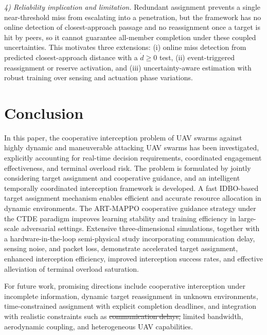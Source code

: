 \documentclass[lettersize,journal]{IEEEtran}
\newcommand{\hladd}[1]{{\color{blue}#1}}
\newcommand{\hldel}[1]{{\color{red}\sout{#1}}}
\begin{document}
\hladd{\emph{4) Reliability implication and limitation.} Redundant assignment prevents a single
near-threshold miss from escalating into a penetration, but the framework has no online detection of
closest-approach passage and no reassignment once a target is hit by peers, so it cannot guarantee
all-member completion under these coupled uncertainties. This motivates three extensions: (i) online
miss detection from predicted closest-approach distance with a $\dot d\!\ge\!0$ test, (ii)
event-triggered reassignment or reserve activation, and (iii) uncertainty-aware estimation with robust
training over sensing and actuation phase variations.}



\section{Conclusion}
\label{sec:conclusion}

In this paper, the cooperative interception problem of UAV swarms against highly dynamic and
maneuverable attacking UAV swarms has been investigated, explicitly accounting for real-time
decision requirements, coordinated engagement effectiveness, and terminal overload risk.
The problem is formulated by jointly considering target assignment and cooperative guidance,
and an intelligent temporally coordinated interception framework is developed.
A fast IDBO-based target assignment mechanism enables efficient and accurate resource
allocation in dynamic environments.
The ART-MAPPO cooperative guidance strategy under the CTDE paradigm improves learning
stability and training efficiency in large-scale adversarial settings.
Extensive \hladd{three-dimensional} simulations\hladd{, together with a hardware-in-the-loop
semi-physical study incorporating communication delay, sensing noise, and packet loss,}
demonstrate accelerated target assignment, enhanced interception efficiency, improved
interception success rates, and effective alleviation of terminal overload saturation.

For future work, promising directions include cooperative interception under incomplete
information, dynamic target reassignment in unknown environments, time-constrained assignment
with explicit completion deadlines, and integration with realistic constraints such as
\hldel{communication delays,} limited bandwidth, \hladd{aerodynamic coupling,} and heterogeneous UAV capabilities.




\end{document}
